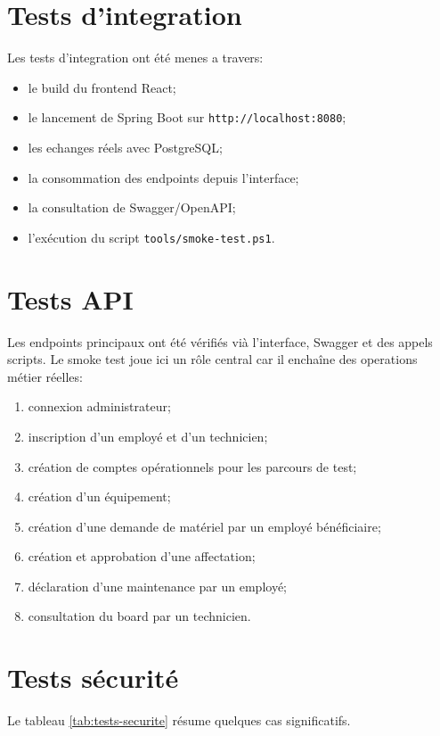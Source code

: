 ﻿\documentclass[12pt,a4paper,oneside]{report}
\begin{document}
\section{Tests d'integration}
Les tests d'integration ont été menes a travers:
\begin{itemize}
  \item le build du frontend React;
  \item le lancement de Spring Boot sur \texttt{http://localhost:8080};
  \item les echanges réels avec PostgreSQL;
  \item la consommation des endpoints depuis l'interface;
  \item la consultation de Swagger/OpenAPI;
  \item l'exécution du script \texttt{tools/smoke-test.ps1}.
\end{itemize}

\section{Tests API}
Les endpoints principaux ont été vérifiés vià l'interface, Swagger et des appels scripts. Le smoke test joue ici un rôle central car il enchaîne des operations métier réelles:
\begin{enumerate}
  \item connexion administrateur;
  \item inscription d'un employé et d'un technicien;
  \item création de comptes opérationnels pour les parcours de test;
  \item création d'un équipement;
  \item création d'une demande de matériel par un employé bénéficiaire;
  \item création et approbation d'une affectation;
  \item déclaration d'une maintenance par un employé;
  \item consultation du board par un technicien.
\end{enumerate}

\section{Tests sécurité}
Le tableau \ref{tab:tests-securite} résume quelques cas significatifs.
\end{document}
